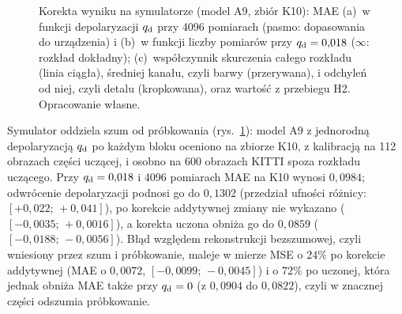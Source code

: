 \begin{figure}[tb]
\centering

\caption[Korekta wyniku na symulatorze i niejednorodne skurczenie rozkładu]{Korekta wyniku na symulatorze (model A9, zbiór K10): MAE (a)~w funkcji depolaryzacji $q_{\mathrm{d}}$ przy 4096 pomiarach (pasmo: dopasowania do urządzenia) i (b)~w funkcji liczby pomiarów przy $q_{\mathrm{d}}=0{,}018$ ($\infty$: rozkład dokładny); (c)~współczynnik skurczenia całego rozkładu (linia ciągła), średniej kanału, czyli barwy (przerywana), i odchyleń od niej, czyli detalu (kropkowana), oraz wartość z przebiegu H2. Opracowanie własne.}
\label{fig:le:pdu:curves}
\end{figure}

Symulator oddziela szum od próbkowania (rys.~\ref{fig:le:pdu:curves}): model A9 z jednorodną depolaryzacją $q_{\mathrm{d}}$ po każdym bloku oceniono na zbiorze K10, z kalibracją na 112 obrazach części uczącej, i osobno na 600 obrazach KITTI spoza rozkładu uczącego.
Przy $q_{\mathrm{d}}=0{,}018$ i 4096 pomiarach MAE na K10 wynosi $0{,}0984$; odwrócenie depolaryzacji podnosi go do $0{,}1302$ (przedział ufności różnicy: $[+0{,}022;\,+0{,}041]$), po korekcie addytywnej zmiany nie wykazano ($[-0{,}0035;\,+0{,}0016]$), a korekta uczona obniża go do $0{,}0859$ ($[-0{,}0188;\,-0{,}0056]$).
Błąd względem rekonstrukcji bezszumowej, czyli wniesiony przez szum i próbkowanie, maleje w mierze MSE o $24\%$ po korekcie addytywnej (MAE o $0{,}0072$, $[-0{,}0099;\,-0{,}0045]$) i o $72\%$ po uczonej, która jednak obniża MAE także przy $q_{\mathrm{d}}=0$ (z $0{,}0904$ do $0{,}0822$), czyli w znacznej części odszumia próbkowanie.
